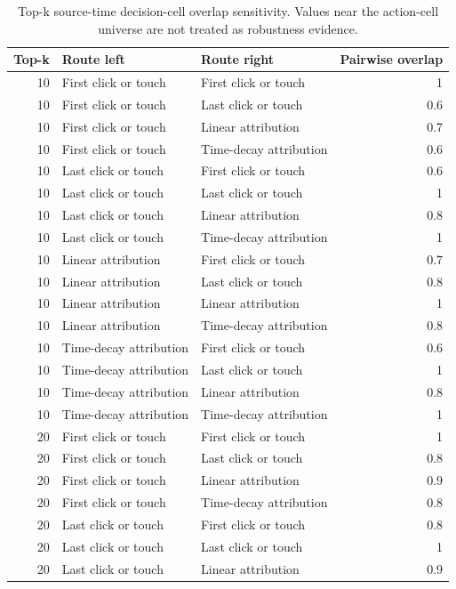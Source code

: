 \begin{table}
\caption{Top-k source-time decision-cell overlap sensitivity. Values near the action-cell universe are not treated as robustness evidence.}
\label{tab:app_exp2_top_k_sensitivity}
\begin{tabular}{rllr}
\toprule
Top-k & Route left & Route right & Pairwise overlap \\
\midrule
10 & First click or touch & First click or touch & 1 \\
10 & First click or touch & Last click or touch & 0.6 \\
10 & First click or touch & Linear attribution & 0.7 \\
10 & First click or touch & Time-decay attribution & 0.6 \\
10 & Last click or touch & First click or touch & 0.6 \\
10 & Last click or touch & Last click or touch & 1 \\
10 & Last click or touch & Linear attribution & 0.8 \\
10 & Last click or touch & Time-decay attribution & 1 \\
10 & Linear attribution & First click or touch & 0.7 \\
10 & Linear attribution & Last click or touch & 0.8 \\
10 & Linear attribution & Linear attribution & 1 \\
10 & Linear attribution & Time-decay attribution & 0.8 \\
10 & Time-decay attribution & First click or touch & 0.6 \\
10 & Time-decay attribution & Last click or touch & 1 \\
10 & Time-decay attribution & Linear attribution & 0.8 \\
10 & Time-decay attribution & Time-decay attribution & 1 \\
20 & First click or touch & First click or touch & 1 \\
20 & First click or touch & Last click or touch & 0.8 \\
20 & First click or touch & Linear attribution & 0.9 \\
20 & First click or touch & Time-decay attribution & 0.8 \\
20 & Last click or touch & First click or touch & 0.8 \\
20 & Last click or touch & Last click or touch & 1 \\
20 & Last click or touch & Linear attribution & 0.9 \\

\end{tabular}
\end{table}
